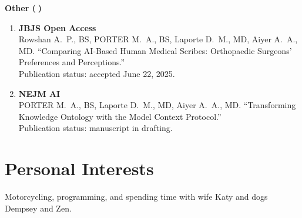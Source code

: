\documentclass[9pt,a4paper]{article}
\newcommand{\emojiOther}{{\emoji 📝}}
\begin{document}
\vspace{0.4em}
\textbf{Other (\emojiOther)}
\begin{enumerate}[leftmargin=*,resume]
  \item \textbf{JBJS Open Access}\\
  Rowshan A.\ P., BS, PORTER M.\ A., BS, Laporte D.\ M., MD, Aiyer A.\ A., MD. ``Comparing AI-Based Human Medical Scribes: Orthopaedic Surgeons’ Preferences and Perceptions.''\\
  Publication status: accepted June 22, 2025.

  \item \textbf{NEJM AI}\\
  PORTER M.\ A., BS, Laporte D.\ M., MD, Aiyer A.\ A., MD. ``Transforming Knowledge Ontology with the Model Context Protocol.''\\
  Publication status: manuscript in drafting.
\end{enumerate}

\section*{Personal Interests}

Motorcycling, programming, and spending time with wife Katy and dogs Dempsey and Zen.
\end{document}
